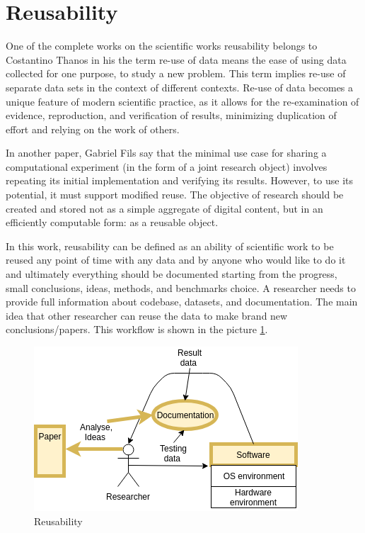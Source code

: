 \section{Reusability}
One of the complete works on the scientific works reusability belongs to Costantino Thanos\cite{DBLP:journals/publications/Thanos17} in his the term re-use of data means the ease of using data collected for one purpose, to study a new problem. This term implies re-use of separate data sets in the context of different contexts. Re-use of data becomes a unique feature of modern scientific practice, as it allows for the re-examination of evidence, reproduction, and verification of results, minimizing duplication of effort and relying on the work of others.\par 
In another paper, Gabriel Fils\cite{DBLP:journals/corr/ThatFYM17} say that the minimal use case for sharing a computational experiment (in the form of a joint research object) involves repeating its initial implementation and verifying its results. However, to use its potential, it must support modified reuse. The objective of research should be created and stored not as a simple aggregate of digital content, but in an efficiently computable form: as a reusable object.\par
In this work, reusability can be defined as an ability of scientific work to be reused any point of time with any data and by anyone who would like to do it and ultimately everything should be documented starting from the progress, small conclusions, ideas, methods, and benchmarks choice. A researcher needs to provide full information about codebase, datasets, and documentation. The main idea that other researcher can reuse the data to make brand new conclusions/papers. This workflow is shown in the picture \ref{fig:reusability}.\par
\begin{figure}[h!]
  \includegraphics[scale=0.8]{fig/reusability.png}
  \caption{Reusability\cite{gith}}
  \label{fig:reusability}
\end{figure}
